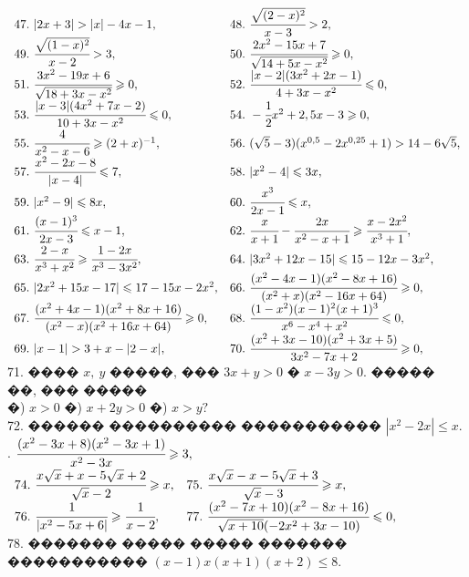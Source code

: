 \documentclass[12pt]{article}
\begin{document}
$\begin{array}{ll}
47.\ |2x+3|>|x|-4x-1,&
48.\ \cfrac{\sqrt{(2-x)^2}}{x-3}>2,\\
49.\ \cfrac{\sqrt{(1-x)^2}}{x-2}>3,&
50.\ \cfrac{2x^2-15x+7}{\sqrt{14+5x-x^2}}\geqslant0,\\
51.\ \cfrac{3x^2-19x+6}{\sqrt{18+3x-x^2}}\geqslant0,&
52.\ \cfrac{|x-2|(3x^2+2x-1)}{4+3x-x^2}\leqslant0,\\
53.\ \cfrac{|x-3|(4x^2+7x-2)}{10+3x-x^2}\leqslant0,&
54.\ -\cfrac{1}{2}x^2+2,5x-3\geqslant0,\\
55.\ \cfrac{4}{x^2-x-6}\geqslant(2+x)^{-1},&
56.\ (\sqrt{5}-3)(x^{0,5}-2x^{0,25}+1)>14-6\sqrt{5},\\
57.\ \cfrac{x^2-2x-8}{|x-4|}\leqslant 7,&
58.\ |x^2-4|\leqslant3x,\\
59.\ |x^2-9|\leqslant8x,&
60.\ \cfrac{x^3}{2x-1}\leqslant x,\\
61.\ \cfrac{(x-1)^3}{2x-3}\leqslant x-1,&
62.\ \cfrac{x}{x+1}-\cfrac{2x}{x^2-x+1}\geqslant\cfrac{x-2x^2}{x^3+1},\\
63.\ \cfrac{2-x}{x^3+x^2}\geqslant\cfrac{1-2x}{x^3-3x^2},&
64.\ |3x^2+12x-15|\leqslant15-12x-3x^2,\\
65.\ |2x^2+15x-17|\leqslant17-15x-2x^2,&
66.\ \cfrac{(x^2-4x-1)(x^2-8x+16)}{(x^2+x)(x^2-16x+64)}\geqslant0,\\
67.\ \cfrac{(x^2+4x-1)(x^2+8x+16)}{(x^2-x)(x^2+16x+64)}\geqslant0,&
68.\ \cfrac{(1-x^2)(x-1)^2(x+1)^3}{x^6-x^4+x^2}\leqslant0,\\
69.\ |x-1|>3+x-|2-x|,&
70.\ \cfrac{(x^2+3x-10)(x^2+3x+5)}{3x^2-7x+2}\geqslant0,
\end{array}$\\
71. ���� $x,\ y$ �����, ��� $3x+y>0$ � $x-3y>0.$ ����� ��, ��� �����\\
�) $x>0$ �) $x+2y>0$ �) $x>y?$\\
72. ������ ���������� ����������� $|x^2-2x|\leqslant x.$ . $\cfrac{(x^2-3x+8)(x^2-3x+1)}{x^2-3x}\geqslant3,$\\
$\begin{array}{ll}
74.\ \cfrac{x\sqrt{x}+x-5\sqrt{x}+2}{\sqrt{x}-2}\geqslant x,&
75.\ \cfrac{x\sqrt{x}-x-5\sqrt{x}+3}{\sqrt{x}-3}\geqslant x,\\
76.\ \cfrac{1}{|x^2-5x+6|}\geqslant \cfrac{1}{x-2},&
77.\ \cfrac{(x^2-7x+10)(x^2-8x+16)}{\sqrt{x+10}(-2x^2+3x-10)}\leqslant 0,
\end{array}$\\
78. ������� ����� ����� ������� ����������� $(x-1)x(x+1)(x+2)\leqslant8.$\\
\end{document}
